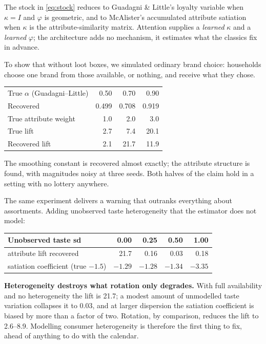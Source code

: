 \documentclass[11pt]{article}
\begin{document}
The stock in \eqref{eq:stock} reduces to Guadagni \& Little's loyalty variable
when $\kappa = I$ and $\varphi$ is geometric, and to McAlister's accumulated
attribute satiation when $\kappa$ is the attribute-similarity matrix. Attention
supplies a \emph{learned} $\kappa$ and a \emph{learned} $\varphi$; the
architecture adds no mechanism, it estimates what the classics fix in advance.

To show that without loot boxes, we simulated ordinary brand choice: households
choose one brand from those available, or nothing, and receive what they chose.

\begin{center}\small
\begin{tabular}{lrrr}
\toprule
True $\alpha$ (Guadagni--Little) & 0.50 & 0.70 & 0.90 \\
Recovered & 0.499 & 0.708 & 0.919 \\
\midrule
True attribute weight & 1.0 & 2.0 & 3.0 \\
True lift & 2.7 & 7.4 & 20.1 \\
Recovered lift & 2.1 & 21.7 & 11.9 \\
\bottomrule
\end{tabular}
\end{center}

\noindent The smoothing constant is recovered almost exactly; the attribute
structure is found, with magnitudes noisy at three seeds. Both halves of the
claim hold in a setting with no lottery anywhere.

The same experiment delivers a warning that outranks everything about
assortments. Adding unobserved taste heterogeneity that the estimator does not
model:

\begin{center}\small
\begin{tabular}{lrrrr}
\toprule
Unobserved taste sd & 0.00 & 0.25 & 0.50 & 1.00 \\
\midrule
attribute lift recovered & 21.7 & 0.16 & 0.03 & 0.18 \\
satiation coefficient (true $-1.5$) & $-1.29$ & $-1.28$ & $-1.34$ & $\mathbf{-3.35}$ \\
\bottomrule
\end{tabular}
\end{center}

\noindent \textbf{Heterogeneity destroys what rotation only degrades.} With full
availability and no heterogeneity the lift is 21.7; a modest amount of
unmodelled taste variation collapses it to 0.03, and at larger dispersion the
satiation coefficient is biased by more than a factor of two. Rotation, by
comparison, reduces the lift to 2.6--8.9. Modelling consumer heterogeneity is
therefore the first thing to fix, ahead of anything to do with the calendar.
\end{document}
